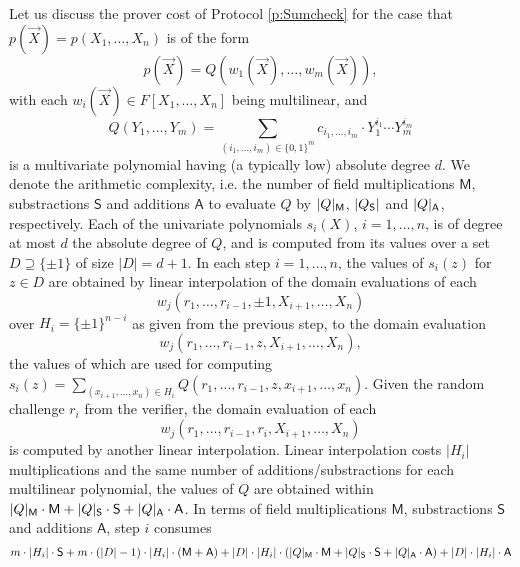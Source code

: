 \documentclass[11pt]{article}
\theoremstyle{definition}
\theoremstyle{remark}
\newtheorem{rem}[thm]{Remark}
\begin{document}
Let us discuss the prover cost of Protocol \ref{p:Sumcheck} for the case that  $p(\vec X) = p(X_1,\ldots, X_n)$ is of the form
\[
p(\vec X) = Q(w_1(\vec X), \ldots, w_m(\vec X)),
\]
with each $w_i(\vec X)\in F[X_1,\ldots, X_n]$ being multilinear, and 
\[
Q(Y_1,\ldots, Y_m) = \sum_{(i_1,\ldots, i_m)\in \{0,1\}^m} c_{i_1,\ldots, i_m} \cdot Y_1^{i_1}\cdots Y_m^{i_m}
\]
 is a multivariate polynomial having (a typically low) absolute degree $d$.
We denote the arithmetic complexity, i.e. the number of field multiplications $\mathsf M$, substractions $\mathsf S$ and additions $\mathsf A$ to evaluate $Q$ by $|Q|_\textsf M$, $|Q_\textsf S|$ and $|Q|_\textsf A$, respectively.
Each of the univariate polynomials $s_i(X)$, $i=1,\ldots, n$, is of degree at most $d$ the absolute degree of $Q$, and is computed from its values over a set $D\supseteq \{\pm 1\}$ of  size $|D| = d + 1$.
In each step $i=1,\ldots, n$, the values of $s_i(z)$ for $z\in D$ are obtained by linear interpolation of the domain evaluations of each
\[
w_j (r_1,\ldots, r_{i-1}, \pm 1, X_{i+1}, \ldots, X_n)
\]
over $H_{i}=\{\pm 1\}^{n-i}$ as given from the previous step, to the domain evaluation
\[
w_j (r_1,\ldots, r_{i-1}, z, X_{i+1}, \ldots, X_n), 
\]
the values of which are used for computing $s_i(z) = \sum_{(x_{i+1},\ldots, x_n)\in H_{i}} Q(r_1,\ldots, r_{i-1}, z, x_{i+1}, \ldots, x_n)$.
Given the random challenge $r_i$ from the verifier, the domain evaluation of each   
\[
w_j(r_1,\ldots, r_{i-1}, r_i, X_{i+1},\ldots, X_n)
\]
is computed by another linear interpolation.
Linear interpolation costs $|H_i|$ multiplications and the same number of additions/substractions for each multilinear polynomial, the values of $Q$ are obtained within $|Q|_\textsf M \cdot \textsf{M} +   |Q|_\textsf S \cdot \textsf S + |Q|_\textsf A \cdot \textsf A$.  
In terms of field multiplications $\mathsf M$, substractions $\mathsf S$ and additions $\mathsf A$, step $i$ consumes 
\begin{align*}
m\cdot |H_i|\cdot \textsf S + m \cdot (|D| - 1)\cdot |H_{i}| \cdot (\textsf M  + \textsf A)
+  |D|\cdot |H_{i}| \cdot ( |Q|_\textsf M \cdot \textsf{M} +   |Q|_\textsf S \cdot \textsf S + |Q|_\textsf A \cdot \textsf A) 
+ |D|\cdot |H_{i}| \cdot \textsf A
\end{align*}
\end{document}
